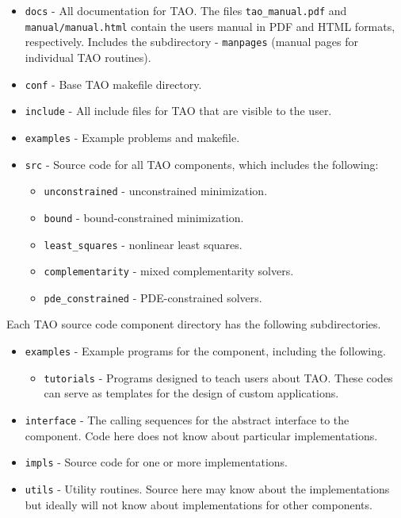 \begin{itemize}
\item \texttt{docs} - All documentation for TAO. The files \texttt{tao\_manual.pdf}
                   and \texttt{manual/manual.html} contain the users manual in
                   PDF and HTML formats, respectively. Includes
                   the subdirectory
 \subitem - \texttt{manpages} (manual pages for individual TAO routines).
\item \texttt{conf} - Base TAO makefile directory.  
\item \texttt{include} - All include files for TAO that are visible to the user.
\item \texttt{examples} - Example problems and makefile.
\item \texttt{src} - Source code for all TAO components, which
                  includes the following:
 \begin{itemize}
 \item \texttt{unconstrained} - unconstrained minimization.
 \item \texttt{bound} - bound-constrained minimization.
 \item \texttt{least\_squares} - nonlinear least squares.
 \item \texttt{complementarity} - mixed complementarity solvers.
 \item \texttt{pde\_constrained} - PDE-constrained solvers.
 \end{itemize}
\end{itemize}

\noindent
Each TAO source code component directory has the following subdirectories.
\begin{itemize}
\item  \texttt{examples} - Example programs for the component, including the
following.
  \begin{itemize}
  \item \texttt{tutorials} - Programs designed to teach users about TAO.  These
          codes can serve as templates for the design of custom
applications.
  \end{itemize}
\item  \texttt{interface} - The calling sequences for the abstract interface  
        to the component.
        Code here does not know about particular implementations.
\item  \texttt{impls} - Source code for one or more implementations.
\item  \texttt{utils} - Utility routines.  Source here may know about the 
          implementations but ideally will not know about implementations
          for other components.
\end{itemize}

